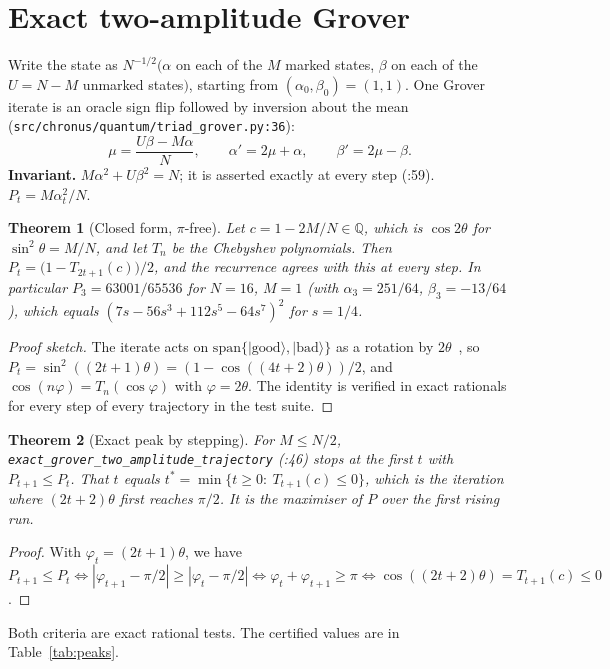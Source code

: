 \documentclass[11pt]{article}
\newtheorem{theorem}{Theorem}[section]
\theoremstyle{definition}
\newcommand{\Q}{\mathbb{Q}}
\newcommand{\code}[1]{\texttt{\small #1}}
\begin{document}
\section{Exact two-amplitude Grover}\label{sec:grover}
Write the state as $N^{-1/2}(\alpha$ on each of the $M$ marked states, $\beta$ on each of the $U=N-M$ unmarked
states$)$, starting from $(\alpha_0,\beta_0)=(1,1)$. One Grover iterate is an oracle sign flip followed by inversion
about the mean (\code{src/chronus/quantum/triad\_grover.py:36}):
\[ \mu=\frac{U\beta-M\alpha}{N},\qquad \alpha'=2\mu+\alpha,\qquad \beta'=2\mu-\beta. \]
\textbf{Invariant.} $M\alpha^2+U\beta^2=N$; it is asserted exactly at every step (:59). $P_t=M\alpha_t^2/N$.

\begin{theorem}[Closed form, $\pi$-free]\label{thm:cheb}
Let $c=1-2M/N\in\Q$, which is $\cos2\theta$ for $\sin^2\theta=M/N$, and let $T_n$ be the Chebyshev polynomials. Then
$P_t=\bigl(1-T_{2t+1}(c)\bigr)/2$, and the recurrence agrees with this at every step. In particular
$P_3=63001/65536$ for $N=16$, $M=1$ (with $\alpha_3=251/64$, $\beta_3=-13/64$), which equals
$(7s-56s^3+112s^5-64s^7)^2$ for $s=1/4$.
\end{theorem}
\begin{proof}[Proof sketch]
The iterate acts on $\mathrm{span}\{|\mathrm{good}\rangle,|\mathrm{bad}\rangle\}$ as a rotation by
$2\theta$~\cite{bbht,nc}, so $P_t=\sin^2((2t+1)\theta)=(1-\cos((4t+2)\theta))/2$, and $\cos(n\varphi)=T_n(\cos\varphi)$
with $\varphi=2\theta$. The identity is verified in exact rationals for every step of every trajectory in the test
suite.
\end{proof}

\begin{theorem}[Exact peak by stepping]\label{thm:peak}
For $M\le N/2$, \code{exact\_grover\_two\_amplitude\_trajectory} (:46) stops at the first $t$ with
$P_{t+1}\le P_t$. That $t$ equals $t^*=\min\{t\ge0:\ T_{t+1}(c)\le0\}$, which is the iteration where
$(2t+2)\theta$ first reaches $\pi/2$. It is the maximiser of $P$ over the first rising run.
\end{theorem}
\begin{proof}
With $\varphi_t=(2t+1)\theta$, we have $P_{t+1}\le P_t\iff|\varphi_{t+1}-\pi/2|\ge|\varphi_t-\pi/2|\iff
\varphi_t+\varphi_{t+1}\ge\pi\iff\cos((2t+2)\theta)=T_{t+1}(c)\le0$.
\end{proof}

Both criteria are exact rational tests. The certified values are in Table~\ref{tab:peaks}.
\end{document}
